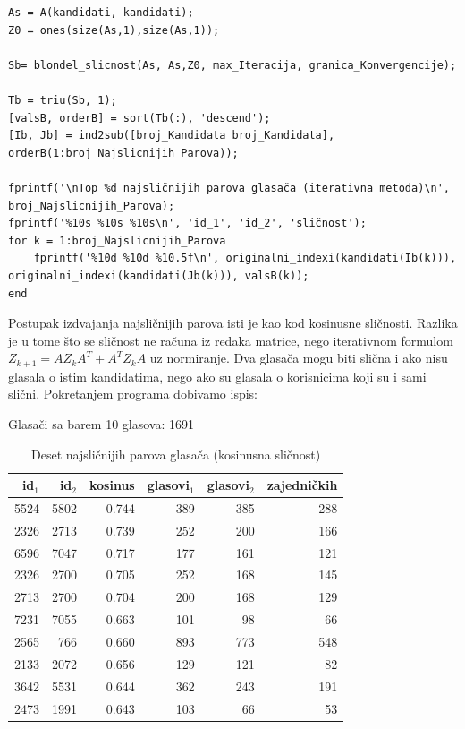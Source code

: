 \documentclass[12pt, letterpaper]{article}
\numberwithin{figure}{section}
\begin{document}
\begin{lstlisting}[style=octave, caption={Iterativna (Blondelova) sličnost glasača}, label={lst:wiki_blondel}]
As = A(kandidati, kandidati);                        
Z0 = ones(size(As,1),size(As,1));

Sb= blondel_slicnost(As, As,Z0, max_Iteracija, granica_Konvergencije);

Tb = triu(Sb, 1);
[valsB, orderB] = sort(Tb(:), 'descend');
[Ib, Jb] = ind2sub([broj_Kandidata broj_Kandidata], orderB(1:broj_Najslicnijih_Parova));

fprintf('\nTop %d najsličnijih parova glasača (iterativna metoda)\n', broj_Najslicnijih_Parova);
fprintf('%10s %10s %10s\n', 'id_1', 'id_2', 'sličnost');
for k = 1:broj_Najslicnijih_Parova
    fprintf('%10d %10d %10.5f\n', originalni_indexi(kandidati(Ib(k))), originalni_indexi(kandidati(Jb(k))), valsB(k));
end
\end{lstlisting}
Postupak izdvajanja najsličnijih parova isti je kao kod kosinusne sličnosti. Razlika je u tome što se sličnost ne računa iz redaka matrice, nego iterativnom formulom $Z_{k+1}=AZ_kA^T+A^TZ_kA$ uz normiranje. Dva glasača mogu biti slična i ako nisu glasala o istim kandidatima, nego ako su glasala o korisnicima koji su i sami slični.
Pokretanjem programa dobivamo ispis:

Glasači sa barem 10 glasova: 1691

\begin{table}[H]
    \centering
    \caption{Deset najsličnijih parova glasača (kosinusna sličnost)}
    \label{tab:wiki_kosinus}
    \begin{tabular}{rrrrrr}
        \toprule
        id$_1$ & id$_2$ & kosinus & glasovi$_1$ & glasovi$_2$ & zajedničkih \\
        \midrule
        5524 & 5802 & 0.744 & 389 & 385 & 288 \\
        2326 & 2713 & 0.739 & 252 & 200 & 166 \\
        6596 & 7047 & 0.717 & 177 & 161 & 121 \\
        2326 & 2700 & 0.705 & 252 & 168 & 145 \\
        2713 & 2700 & 0.704 & 200 & 168 & 129 \\
        7231 & 7055 & 0.663 & 101 & 98  & 66  \\
        2565 & 766  & 0.660 & 893 & 773 & 548 \\
        2133 & 2072 & 0.656 & 129 & 121 & 82  \\
        3642 & 5531 & 0.644 & 362 & 243 & 191 \\
        2473 & 1991 & 0.643 & 103 & 66  & 53  \\
        \bottomrule
    \end{tabular}
\end{table}
\end{document}
